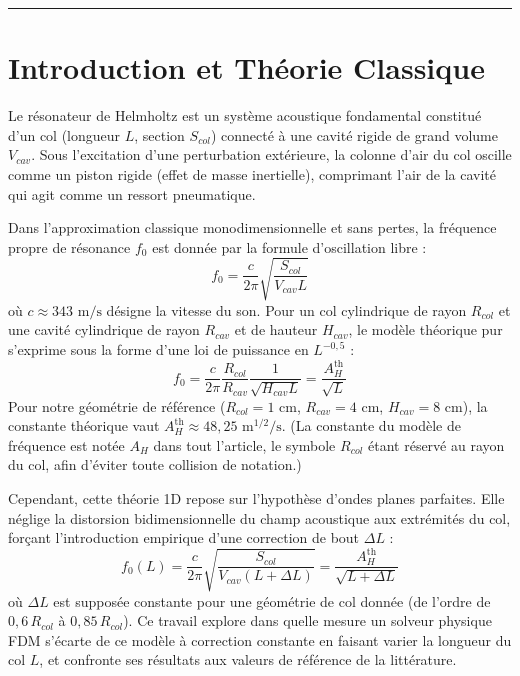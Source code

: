 \documentclass[11pt,a4paper,twocolumn]{article}
\begin{document}
\vspace{0.4em}
\begingroup
\setcounter{tocdepth}{1}
\renewcommand{\contentsname}{\normalsize\color{accent}\textbf{Sommaire}}
{\small\tableofcontents}
\endgroup
\vspace{0.4em}
\hrule
\vspace{0.8em}

\section{Introduction et Théorie Classique}
Le résonateur de Helmholtz est un système acoustique fondamental \cite{helmholtz1860} constitué d'un col (longueur $L$, section $S_{col}$) connecté à une cavité rigide de grand volume $V_{cav}$. Sous l'excitation d'une perturbation extérieure, la colonne d'air du col oscille comme un piston rigide (effet de masse inertielle), comprimant l'air de la cavité qui agit comme un ressort pneumatique.

Dans l'approximation classique monodimensionnelle et sans pertes, la fréquence propre de résonance $f_0$ est donnée par la formule d'oscillation libre :
\begin{equation}
\label{eq:helmholtz_1d_pure}
f_0 = \frac{c}{2\pi} \sqrt{\frac{S_{col}}{V_{cav} L}}
\end{equation}
où $c \approx 343\text{ m/s}$ désigne la vitesse du son. Pour un col cylindrique de rayon $R_{col}$ et une cavité cylindrique de rayon $R_{cav}$ et de hauteur $H_{cav}$, le modèle théorique pur s'exprime sous la forme d'une loi de puissance en $L^{-0{,}5}$ :
\begin{equation}
f_0 = \frac{c}{2\pi} \frac{R_{col}}{R_{cav}} \frac{1}{\sqrt{H_{cav} L}} = \frac{A_H^{\mathrm{th}}}{\sqrt{L}}
\end{equation}
Pour notre géométrie de référence ($R_{col}=1\text{ cm}$, $R_{cav}=4\text{ cm}$, $H_{cav}=8\text{ cm}$), la constante théorique vaut $A_H^{\mathrm{th}} \approx 48{,}25\text{ m}^{1/2}/\text{s}$. (La constante du modèle de fréquence est notée $A_H$ dans tout l'article, le symbole $R_{col}$ étant réservé au rayon du col, afin d'éviter toute collision de notation.)

Cependant, cette théorie 1D repose sur l'hypothèse d'ondes planes parfaites. Elle néglige la distorsion bidimensionnelle du champ acoustique aux extrémités du col, forçant l'introduction empirique d'une correction de bout $\Delta L$ \cite{rayleigh1896, peters2003end} :
\begin{equation}
\label{eq:helmholtz_correction}
f_0(L) = \frac{c}{2\pi} \sqrt{\frac{S_{col}}{V_{cav} (L + \Delta L)}} = \frac{A_H^{\mathrm{th}}}{\sqrt{L + \Delta L}}
\end{equation}
où $\Delta L$ est supposée constante pour une géométrie de col donnée (de l'ordre de $0{,}6 \, R_{col}$ à $0{,}85 \, R_{col}$). Ce travail explore dans quelle mesure un solveur physique FDM s'écarte de ce modèle à correction constante en faisant varier la longueur du col $L$, et confronte ses résultats aux valeurs de référence de la littérature.
\end{document}
